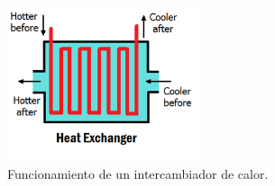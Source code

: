 \documentclass[12pt, letterpaper]{article}
\begin{document}
		\begin{figure}
			\begin{center}
			\includegraphics[width=0.5\textwidth]{heat.png}
			\end{center}
			\caption{Funcionamiento de un intercambiador de calor.}
		\end{figure}
\renewcommand\refname{Referencias}
\printbibliography
\end{document}
